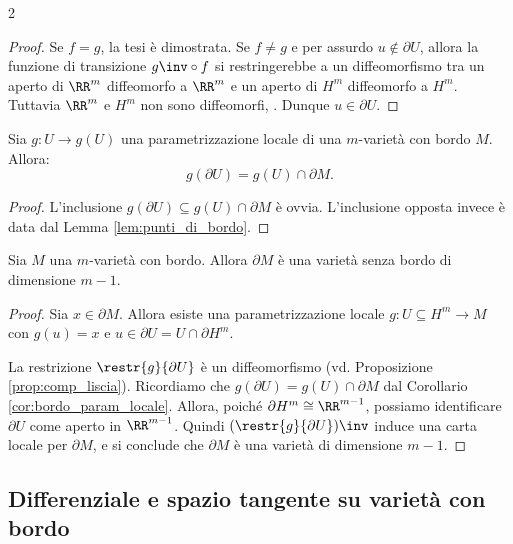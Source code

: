 \begin{multicols*}{2}
\begin{proof}
        Se $f = g$, la tesi è dimostrata. Se $f \neq g$ e per assurdo $u \notin \partial U$,
        allora la funzione di transizione $g\inv \circ f$ si restringerebbe a
        un diffeomorfismo tra un aperto di $\RR^m$ diffeomorfo a $\RR^m$ e
        un aperto di $H^m$ diffeomorfo a $H^m$. Tuttavia $\RR^m$ e
        $H^m$ non sono diffeomorfi, \Lightning. Dunque $u \in \partial U$.
    \end{proof}

    \begin{corollary} \label{cor:bordo_param_locale}
        Sia $g : U \to g(U)$ una parametrizzazione locale di una $m$-varietà con bordo $M$. Allora:
        \[
            \boxed{g(\partial U) = g(U) \cap \partial M.}
        \]
    \end{corollary}

    \begin{proof}
        L'inclusione $g(\partial U) \subseteq g(U) \cap \partial M$ è ovvia.
        L'inclusione opposta invece è data dal Lemma \ref{lem:punti_di_bordo}.
    \end{proof}

    \begin{proposition} \label{prop:bordo_è_varietà}
        Sia $M$ una $m$-varietà con bordo. Allora $\partial M$ è
        una varietà senza bordo di dimensione $m-1$.
    \end{proposition}

    \begin{proof}
        Sia $x \in \partial M$. Allora esiste una parametrizzazione locale
        $g : U \subseteq H^m \to M$ con $g(u) = x$ e $u \in \partial U = U \cap \partial H^m$. \smallskip

        La restrizione $\restr{g}{\partial U}$ è un diffeomorfismo (vd. Proposizione \ref{prop:comp_liscia}). Ricordiamo che
        $g(\partial U) = g(U) \cap \partial M$ dal Corollario \ref{cor:bordo_param_locale}. Allora, poiché
        $\partial H^m \cong \RR^{m-1}$, possiamo identificare
        $\partial U$ come aperto in $\RR^{m-1}$. Quindi
        $(\restr{g}{\partial U})\inv$ induce una carta locale per $\partial M$,
        e si conclude che $\partial M$ è una varietà di dimensione $m-1$. \smallskip
    \end{proof}

    \subsection{Differenziale e spazio tangente su varietà con bordo}


\end{multicols*}
